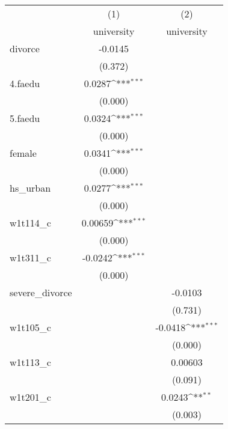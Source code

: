 {
\def\sym#1{\ifmmode^{#1}\else\(^{#1}\)\fi}
\begin{tabular}{l*{2}{c}}
\hline\hline
            &\multicolumn{1}{c}{(1)}&\multicolumn{1}{c}{(2)}\\
            &\multicolumn{1}{c}{university}&\multicolumn{1}{c}{university}\\
\hline
divorce     &     -0.0145         &                     \\
            &     (0.372)         &                     \\
[1em]
4.faedu     &      0.0287\sym{***}&                     \\
            &     (0.000)         &                     \\
[1em]
5.faedu     &      0.0324\sym{***}&                     \\
            &     (0.000)         &                     \\
[1em]
female      &      0.0341\sym{***}&                     \\
            &     (0.000)         &                     \\
[1em]
hs\_urban    &      0.0277\sym{***}&                     \\
            &     (0.000)         &                     \\
[1em]
w1t114\_c    &     0.00659\sym{***}&                     \\
            &     (0.000)         &                     \\
[1em]
w1t311\_c    &     -0.0242\sym{***}&                     \\
            &     (0.000)         &                     \\
[1em]
severe\_divorce&                     &     -0.0103         \\
            &                     &     (0.731)         \\
[1em]
w1t105\_c    &                     &     -0.0418\sym{***}\\
            &                     &     (0.000)         \\
[1em]
w1t113\_c    &                     &     0.00603         \\
            &                     &     (0.091)         \\
[1em]
w1t201\_c    &                     &      0.0243\sym{**} \\
            &                     &     (0.003)         \\
[1em]

\end{tabular}}
